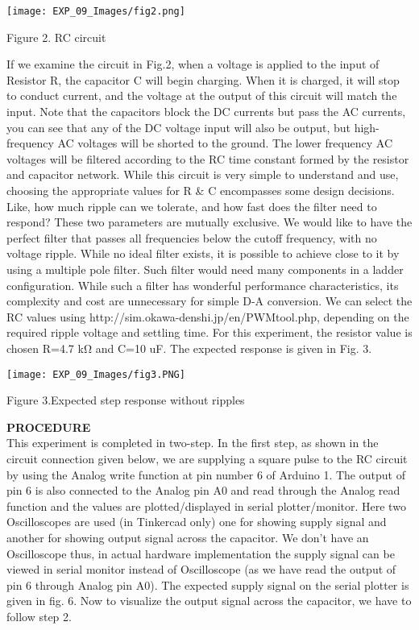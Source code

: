 \documentclass[12pt,a4paper]{article}
\begin{document}
\begin{justify}
\begin{center} 
\texttt{[image: EXP\_09\_Images/fig2.png]}
\end{center}
\begin{center} {Figure 2. RC circuit }\\[21pt]\end{center}

\noindent If we examine the circuit in Fig.2, when a voltage is applied to the input of Resistor R, the capacitor C will begin charging. When it is charged, it will stop to conduct current, and the voltage at the output of this circuit will match the input. Note that the capacitors block the DC currents but pass the AC currents, you can see that any of the DC voltage input will also be output, but high-frequency AC voltages will be shorted to the ground. The lower frequency AC voltages will be filtered according to the RC time constant formed by the resistor and capacitor network. While this circuit is very simple to understand and use, choosing the appropriate values for R & C encompasses some design decisions. Like, how much ripple can we tolerate, and how fast does the filter need to respond? These two parameters are mutually exclusive. We would like to have the perfect filter that passes all frequencies below the cutoff frequency, with no voltage ripple. While no ideal filter exists, it is possible to achieve close to it by using a multiple pole filter. Such filter would need many components in a ladder configuration. While such a filter has wonderful performance characteristics, its complexity and cost are unnecessary for simple D-A conversion. We can select the RC values using http://sim.okawa-denshi.jp/en/PWMtool.php, depending on the required ripple voltage and settling time. For this experiment, the resistor value is chosen R=4.7 kΩ and C=10 uF. The expected response is given in Fig. 3.

\begin{center} 
\texttt{[image: EXP\_09\_Images/fig3.PNG]}
\end{center}
\begin{center} {Figure 3.Expected step response without ripples}\end{center}

\noindent \textbf{\large PROCEDURE}\\[3pt]
This experiment is completed in two-step. In the first step, as shown in the circuit connection given below, we are supplying a square pulse to the RC circuit by using the Analog write function at pin number 6 of Arduino 1. The output of pin 6 is also connected to the Analog pin A0 and read through the Analog read function and the values are plotted/displayed in serial plotter/monitor. Here two Oscilloscopes are used (in Tinkercad only) one for showing supply signal and another for showing output signal across the capacitor. We don’t have an Oscilloscope thus, in actual hardware implementation the supply signal can be viewed in serial monitor instead of Oscilloscope (as we have read the output of pin 6 through Analog pin A0). The expected supply signal on the serial plotter is given in fig. 6. Now to visualize the output signal across the capacitor,  we have to follow step 2. 


\end{justify}
\end{document}
